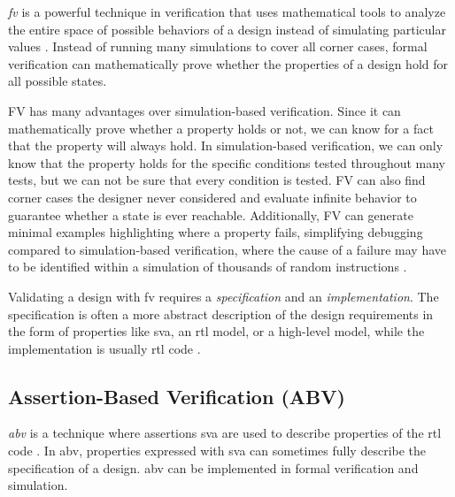 \textit{\acrfull{fv}} is a powerful technique in verification that uses mathematical tools to analyze the entire space of possible behaviors of a design instead of simulating particular values \cite{seligmanFormalVerificationEssential2015}. Instead of running many simulations to cover all corner cases, formal verification can mathematically prove whether the properties of a design hold for all possible states.

FV has many advantages over simulation-based verification. Since it can mathematically prove whether a property holds or not, we can know for a fact that the property will always hold. In simulation-based verification, we can only know that the property holds for the specific conditions tested throughout many tests, but we can not be sure that every condition is tested. FV can also find corner cases the designer never considered and evaluate infinite behavior to guarantee whether a state is ever reachable.
Additionally, FV can generate minimal examples highlighting where a property fails, simplifying debugging compared to simulation-based verification, where the cause of a failure may have to be identified within a simulation of thousands of random instructions \cite{seligmanFormalVerificationEssential2015}.

Validating a design with \acrshort{fv} requires a \textit{specification} and an \textit{implementation}. The specification is often a more abstract description of the design requirements in the form of properties like \acrfull{sva}, an \acrshort{rtl} model, or a high-level model, while the implementation is usually \acrshort{rtl} code \cite{seligmanFormalVerificationEssential2015}. 


\subsection{Assertion-Based Verification (ABV)}

\textit{\acrfull{abv}} is a technique where assertions \acrfull{sva} are used to describe properties of the \acrshort{rtl} code \cite{seligmanFormalVerificationEssential2015}. In \acrshort{abv}, properties expressed with \acrshort{sva} can sometimes fully describe the specification of a design. \acrshort{abv} can be implemented in formal verification and simulation.


